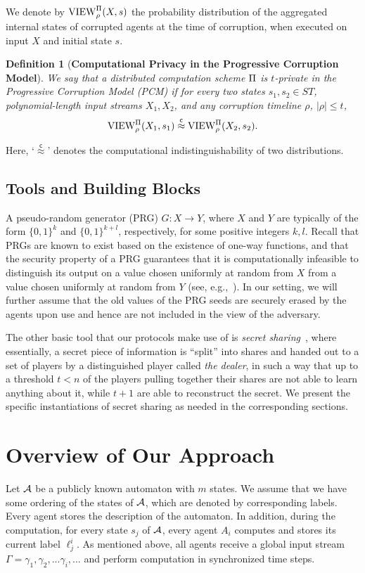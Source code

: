\documentclass[letterpaper,11pt]{article}
\newcommand{\A}{$\cal A$}
\newcommand{\rmPi}{\rm {\Pi}}
\newcommand{\view}{\mathrm{VIEW}}
\newcommand{\compind}{\ensuremath{\stackrel{\mathsf{c}}{\mathop\approx}}}
\newtheorem{definition}{Definition}
\begin{document}
We denote by $\view_{\rho}^{\rmPi}(X, s)$ the probability
distribution of the aggregated internal states of corrupted agents at
the time of corruption, when executed on input $X$ and
initial state $s$.




\begin{definition} [\bf Computational Privacy in the Progressive Corruption Model]
\label{defProgressive}
We say that a distributed computation scheme $\rmPi$ is {\rm
$t$-private in the Progressive Corruption Model (PCM)} if for every
two states $s_1, s_2 \in ST$, polynomial-length input streams $X_1,
X_2$, and any corruption timeline $\rho$, $|\rho| \leq
t$,
\[
\view_{\rho}^{\rmPi}(X_1, s_1) \compind \view_{\rho}^{\rmPi}(X_2, s_2).
\]
\end{definition}
\noindent Here, `$\compind$' denotes the computational indistinguishability
of two distributions.






\subsection{Tools and Building Blocks}
\label{sec:tools-app}
A pseudo-random generator (PRG) $G : X \rightarrow Y$, where $X$ and $Y$ are typically of the
form $\{0,1\}^k$ and $\{0,1\}^{k+l}$, respectively, for some positive
integers $k,l$. Recall that PRGs are known to exist based on the
existence of one-way functions, and that the security property of a
PRG guarantees that it is computationally infeasible to distinguish
its output on a value chosen uniformly at random from $X$ from a value
chosen uniformly at random from $Y$ (see,
e.g.,~\cite{Goldreich2000}). In our setting, we will further assume that
the old values
of the PRG seeds are securely erased by the agents upon use and hence are
not included in the view of the adversary.

The other basic tool that our protocols make use of 
is
{\em secret sharing}~\cite{Sha79}, where
essentially, a secret piece of information is ``split'' into shares
and handed out to a set of players by a distinguished player called
{\em the dealer}, in such a way that up to a threshold $t < n$ of the
players pulling together their shares are not able to learn anything
about it, while $t + 1$ are able to reconstruct the secret. We
present the specific instantiations of secret sharing as needed
in the 
corresponding sections.
 
\section{Overview of Our Approach}
\label{outline}
Let $\cal A$ be a publicly known automaton with $m$ states. We assume
that we have some ordering of the states of \A, which are denoted
by corresponding labels.  Every agent
stores the description of the automaton. In addition, during the
computation, for every state $s_j$ of \A, every agent $A_i$ computes
and stores its current label $\ell _j ^ i$. 
As mentioned above, all agents receive a global input stream
$\Gamma=\gamma_1,\gamma_2,...\gamma_i,...$ and perform computation in
synchronized time steps.
\end{document}
